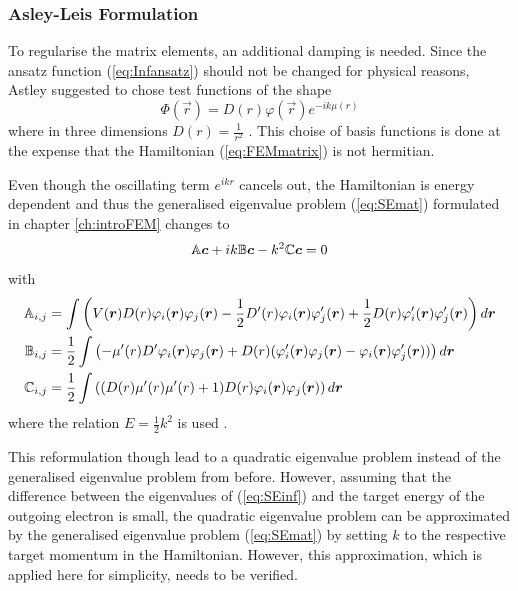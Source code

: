 \subsubsection{Asley-Leis Formulation}
To regularise the matrix elements, an additional damping is needed.
Since the ansatz function (\ref{eq:Infansatz}) should not be changed for physical reasons, Astley suggested to chose test functions of the shape
\begin{equation} \label{eq:ALelem}
 \Phi(\vec{r}) = D(r)\varphi(\vec{r}) e^{-ik\mu(r)}
\end{equation}
where in three dimensions $D(r)=\frac{1}{r^2}$ \cite{astley2}.
This choise of basis functions is done at the expense that the Hamiltonian (\ref{eq:FEMmatrix}) is not hermitian.

Even though the oscillating term $e^{ikr}$ cancels out, the Hamiltonian is energy dependent and thus the generalised eigenvalue problem (\ref{eq:SEmat}) formulated in chapter \ref{ch:introFEM} changes to
\begin{equation} \label{eq:SEinf}
\mathbb{A}\bm{c} +ik \mathbb{B}\bm{c}- k^2 \mathbb{C}\bm{c} =0 
\end{equation}
with
\begin{align} \label{eq:InFEMmatrix}
\mathbb{A}_{i,j}& =\int \left(V(\bm{r}) D(r) \varphi_i(\bm{r}) \varphi_j(\bm{r}) 
                 -\frac 12 D'(r) \varphi_i(\bm{r})\varphi'_j(\bm{r})
                 +\frac 12 D(r) \varphi'_i(\bm{r})\varphi'_j(\bm{r}) \right) d\bm{r}\\
\mathbb{B}_{i,j}&=\frac 12 \int\left( -\mu'(r)D' \varphi_i(\bm{r})\varphi_j(\bm{r})
                + D(r) (\varphi'_i(\bm{r})\varphi_j(\bm{r}) -\varphi_i(\bm{r})\varphi'_j(\bm{r})) \right) d\bm{r} \\
\mathbb{C}_{i,j}&= \frac 12 \int\left( (D(r) \mu'(r) \mu'(r) + 1) D(r) \varphi_i(\bm{r}) \varphi_j(\bm{r})\right) d\bm{r}
\end{align}
where the relation $E=\frac 12 k^2$ is used \cite{dreyer}.

This reformulation though lead to a quadratic eigenvalue problem instead of the generalised eigenvalue problem from before.
However, assuming that the difference between the eigenvalues of (\ref{eq:SEinf}) and the target energy of the outgoing electron is small, the quadratic eigenvalue problem can be approximated by the generalised eigenvalue problem (\ref{eq:SEmat}) by setting $k$ to the respective target momentum in the Hamiltonian.
However, this approximation, which is applied here for simplicity, needs to be verified.

